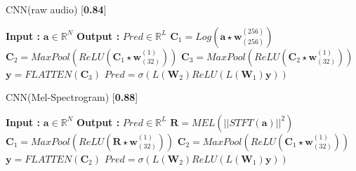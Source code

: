\begin{minipage}[t]{7.5cm}
  \vspace{0pt}  
  \begin{algorithm}[H]
    \caption{CNN(raw audio) [\textbf{0.84}]}
    \begin{algorithmic}[1]
      \Statex \textbf{Input :} $\textbf{a} \in \mathbb{R}^{N}$
      \Statex \textbf{Output :} $Pred \in \mathbb{R}^{L}$ 
      \State $\textbf{C}_{1}  = Log(\textbf{a}\star\textbf{w}_{(256)}^{(256)})$
      \State $\textbf{C}_{2} =  MaxPool(ReLU(\textbf{C}_{1}\star\textbf{w}_{(32)}^{(1)}))$
       \State $\textbf{C}_{3} = MaxPool(ReLU(\textbf{C}_{2}\star\textbf{w}_{(32)}^{(1)}))$
       \State $\textbf{y} = FLATTEN(\textbf{C}_{3})$
       \State $Pred = \sigma(L(\textbf{W}_{2})ReLU(L(\textbf{W}_{1})\textbf{y}))$
   \end{algorithmic}
  \end{algorithm}
\end{minipage}%
\begin{minipage}[t]{7.5cm}
  \vspace{0pt}
  \begin{algorithm}[H]
    \caption{CNN(Mel-Spectrogram) [\textbf{0.88}]}
     \begin{algorithmic}[1]
      \Statex \textbf{Input :} $\textbf{a} \in \mathbb{R}^{N}$
      \Statex \textbf{Output :} $Pred \in \mathbb{R}^{L}$ 
      \State $\textbf{R}  = MEL(||STFT(\textbf{a})||^{2})$
      \State $\textbf{C}_{1} =  MaxPool(ReLU(\textbf{R}\star\textbf{w}_{(32)}^{(1)}))$
       \State $\textbf{C}_{2} = MaxPool(ReLU(\textbf{C}_{1}\star\textbf{w}_{(32)}^{(1)}))$
       \State $\textbf{y} = FLATTEN(\textbf{C}_{2})$
       \State $Pred = \sigma(L(\textbf{W}_{2})ReLU(L(\textbf{W}_{1})\textbf{y}))$
   \end{algorithmic}
  \end{algorithm}
\end{minipage}

